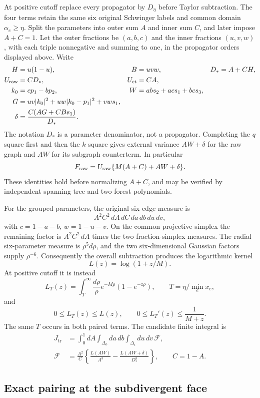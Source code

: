 At positive cutoff replace every propagator by $D_\eta$ before Taylor
subtraction. The four terms retain the same six original Schwinger labels
and common domain $\alpha_e\ge\eta$. Split the parameters into outer sum
$A$ and inner sum $C$, and later impose $A+C=1$. Let the outer fractions be
$(a,b,c)$ and the inner fractions $(u,v,w)$, with each triple nonnegative
and summing to one, in the propagator orders displayed above. Write
\begin{align*}
 H&=u(1-u),& B&=uvw,& D_*&=A+CH,\\
 U_{\rm raw}&=CD_*,& U_{\rm ct}&=CA,\\
 k_0&=cp_1-bp_2,&
 W&=ab s_2+ac s_1+bc s_3,\\
 G&=uv|k_0|^2+uw|k_0-p_1|^2+vw s_1,\\
 \delta&=\frac{C(AG+CBs_1)}{D_*}.
\end{align*}
The notation $D_*$ is a parameter denominator, not a propagator.
Completing the $q$ square first and then the $k$ square gives external
variance $AW+\delta$ for the raw graph and $AW$ for its subgraph
counterterm. In particular
\[
 F_{\rm raw}=U_{\rm raw}\{M(A+C)+AW+\delta\}.
\]
These identities hold before normalizing $A+C$, and may be verified by
independent spanning-tree and two-forest polynomials.

For the grouped parameters, the original six-edge measure is
\[
 A^2C^2\,dA\,dC\,da\,db\,du\,dv,
\]
with $c=1-a-b$, $w=1-u-v$. On the common projective simplex the remaining
factor is $A^2C^2\,dA$ times the two fraction-simplex measures. The radial
six-parameter measure is $\rho^5d\rho$, and the two six-dimensional
Gaussian factors supply $\rho^{-6}$. Consequently the overall subtraction
produces the logarithmic kernel
\[
 L(z)=\log(1+z/M).
\]
At positive cutoff it is instead
\[
 L_T(z)=\int_T^\infty\frac{d\rho}{\rho}
           e^{-M\rho}(1-e^{-z\rho}),\qquad
 T=\eta/\min_e x_e,
\]
and
\[
 0\le L_T(z)\le L(z),\qquad
 0\le L_T'(z)\le\frac1{M+z}.
\]
The same $T$ occurs in both paired terms. The candidate finite integral is
\begin{align*}
 J_{\mathrm{tr}}
 &=\int_0^1dA\int_{\Delta_o}da\,db\int_{\Delta_i}du\,dv\,\mathcal F,\\
 \mathcal F
 &=\frac{A^2}{C}
       \left\{\frac{L(AW)}{A^3}
                    -\frac{L(AW+\delta)}{D_*^3}\right\},\qquad C=1-A.
\end{align*}

\subsection{Exact pairing at the subdivergent face}

